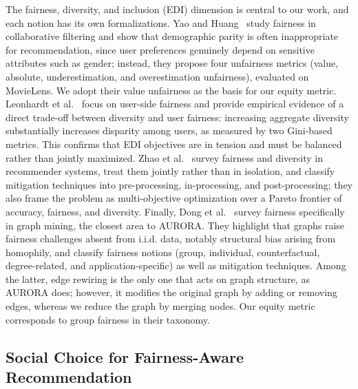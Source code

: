 \documentclass[runningheads]{llncs}
\begin{document}
The fairness, diversity, and inclusion (EDI) dimension is central to our work,
and each notion has its own formalizations. Yao and
Huang~\cite{yao_new_2017} study fairness in collaborative filtering and show
that demographic parity is often inappropriate for recommendation, since user
preferences genuinely depend on sensitive attributes such as gender; instead,
they propose four unfairness metrics (value, absolute, underestimation, and
overestimation unfairness), evaluated on MovieLens. We adopt their value
unfairness as the basis for our equity metric. Leonhardt et
al.~\cite{leonhardt_user_2018} focus on user-side fairness and provide
empirical evidence of a direct trade-off between diversity and user fairness:
increasing aggregate diversity substantially increases disparity among users,
as measured by two Gini-based metrics. This confirms that EDI objectives are
in tension and must be balanced rather than jointly maximized. Zhao et
al.~\cite{zhao_fairness_2024} survey fairness and diversity in recommender
systems, treat them jointly rather than in isolation, and classify mitigation
techniques into pre-processing, in-processing, and post-processing; they also
frame the problem as multi-objective optimization over a Pareto frontier of
accuracy, fairness, and diversity. Finally, Dong et
al.~\cite{dong_fairness_2023} survey fairness specifically in graph mining,
the closest area to AURORA. They highlight that graphs raise fairness challenges
absent from i.i.d. data, notably structural bias arising from homophily, and
classify fairness notions (group, individual, counterfactual, degree-related,
and application-specific) as well as mitigation techniques. Among the latter,
edge rewiring is the only one that acts on graph structure, as AURORA does;
however, it modifies the original graph by adding or removing edges, whereas
we reduce the graph by merging nodes. Our equity metric corresponds to group
fairness in their taxonomy.

\subsection{Social Choice for Fairness-Aware Recommendation}
\end{document}
